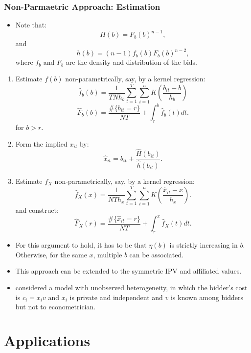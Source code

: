 \documentclass[
]{book}
\providecommand{\tightlist}{%
  \setlength{\itemsep}{0pt}\setlength{\parskip}{0pt}}
\begin{document}
\hypertarget{non-parmaetric-approach-estimation}{%
\subsection{Non-Parmaetric Approach: Estimation}\label{non-parmaetric-approach-estimation}}

\begin{itemize}
\tightlist
\item
  Note that:
  \[
  H(b) = F_b(b)^{n - 1},
  \]
  and
  \[
  h(b) = (n - 1) f_b(b) F_b(b)^{n - 2},
  \]
  where \(f_b\) and \(F_b\) are the density and distribution of the bids.
\end{itemize}

\begin{enumerate}
\def\labelenumi{\arabic{enumi}.}
\tightlist
\item
  Estimate \(f(b)\) non-parametrically, say, by a kernel regression:
  \[
  \hat{f}_b(b) = \frac{1}{TN h_b}\sum_{t = 1}^T \sum_{i = 1}^n K\left(\frac{b_{it} - b}{h_b}\right)
  \]
  \[
  \widehat{F}_b(b) = \frac{\#\{b_{it} = r\}}{NT} +  \int_{r}^b \hat{f}_b(t) dt.
  \]
  for \(b > r\).
\item
  Form the implied \(x_{it}\) by:
  \[
  \hat{x}_{it} = b_{it} + \frac{\widehat{H}(b_{it})}{\hat{h}(b_{it})}.
  \]
\item
  Estimate \(f_X\) non-parametrically, say, by a kernel regression:
  \[
  \hat{f}_X(x) = \frac{1}{NT h_x} \sum_{t = 1}^T \sum_{i = 1}^n K\left(\frac{\hat{x}_{it} - x}{h_x}\right).
  \]
  and construct:
  \[
  \widehat{F}_X(r) = \frac{\#\{\hat{x}_{it} = r\}}{NT} + \int_r^x \hat{f}_X(t) dt.
  \]
\end{enumerate}

\begin{itemize}
\tightlist
\item
  For this argument to hold, it has to be that \(\eta(b)\) is strictly increasing in \(b\). Otherwise, for the same \(x\), multiple \(b\) can be associated.
\item
  This approach can be extended to the symmetric IPV and affiliated values.
\item
  \citet{krasnokutskayaIdentificationEstimationAuction2011} considered a model with unobserved heterogeneity, in which the bidder's cost is \(c_i = x_i v\) and \(x_i\) is private and independent and \(v\) is known among bidders but not to econometrician.
\end{itemize}

\hypertarget{applications}{%
\chapter{Applications}\label{applications}}
\end{document}
